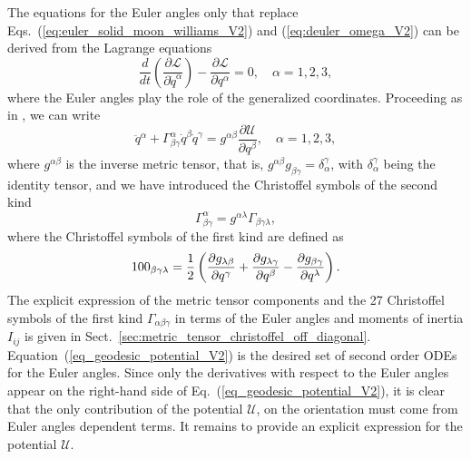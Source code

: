 \documentclass[lineno, pdflatex,sn-mathphys-ay]{sn-jnl}
\theoremstyle{thmstyleone}%
\theoremstyle{thmstyletwo}%
\theoremstyle{thmstylethree}%
\begin{document}
The equations for the Euler angles only that replace Eqs.~(\ref{eq:euler_solid_moon_williams_V2}) and (\ref{eq:deuler_omega_V2}) can be derived from the Lagrange equations
%
\begin{equation}
	\frac{d}{dt}\left(\frac{\partial \mathcal{L}}{\partial \dot{q}^\alpha}\right) - \frac{\partial \mathcal{L}}{\partial q^\alpha} = 0, \quad \alpha = 1, 2,3,
\end{equation}
%
where the Euler angles play the role of the generalized coordinates.
Proceeding as in  \citet{Broucke1990doi:10.2514/3.20591}, we can write
%
\begin{equation}\label{eq_geodesic_potential_V2}
	\ddot{q}^\alpha + 
	\Gamma^{\alpha}_{\beta\gamma} \dot{q}^\beta \dot{q}^\gamma =
	g^{\alpha\beta} \frac{\partial \mathcal{U}}{\partial q^\beta}, \quad \alpha = 1,2,3,
\end{equation}
%
where $g^{\alpha\beta}$ is the inverse metric tensor, that is, ${g^{\alpha\beta}  g_{\beta\gamma} = \delta_\alpha^\gamma}$, with $\delta_\alpha^\gamma$ being the identity tensor,
and we have introduced the Christoffel symbols of the second kind
%
\begin{equation} \label{eq:def_Christoffel_2nd_V2}
	\Gamma^\alpha_{\beta\gamma} = 
	g^{\alpha\lambda} \Gamma_{\beta\gamma\lambda}, %
\end{equation}
where the Christoffel symbols of the first kind are defined as
\begin{equation} \label{eq:def_Christoffel_1st_V2}
	100_{\beta\gamma\lambda} = 
	 \frac{1}{2} \left( \pdv{g_{\lambda\beta}}{q^\gamma} + \pdv{g_{\lambda\gamma}}{q^\beta} - \pdv{g_{\beta\gamma}}{q^\lambda} \right).
\end{equation}
%
The explicit expression of the metric tensor components and the 27 Christoffel symbols of the first kind $\Gamma_{\alpha\beta\gamma}$ in terms of the Euler angles and moments of inertia ${I}_{ij}$ is given in Sect.~\ref{sec:metric_tensor_christoffel_off_diagonal}.
Equation~(\ref{eq_geodesic_potential_V2}) is the desired set of second order ODEs for the Euler angles.
Since only the derivatives with respect to the Euler angles appear on the right-hand side of Eq.~(\ref{eq_geodesic_potential_V2}), it is clear that the only contribution of the potential $\mathcal{U}$, on the orientation must come from Euler angles dependent terms.
%
It remains to provide an explicit expression for the potential $\mathcal{U}$.
\end{document}
